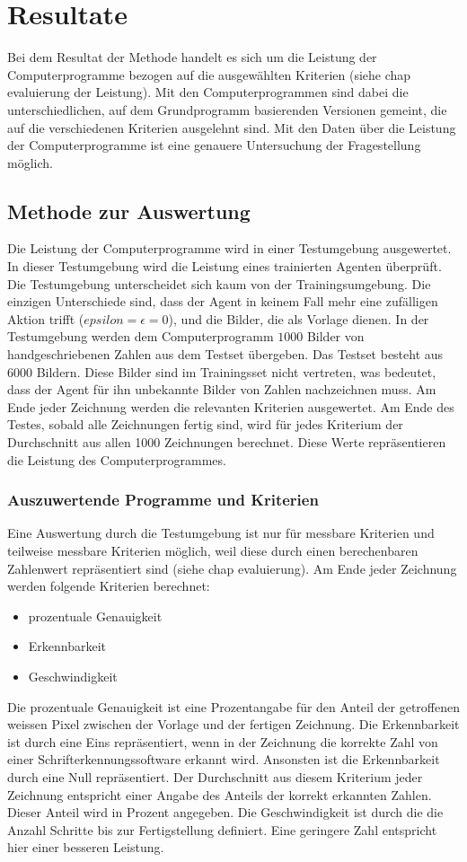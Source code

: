 \chapter{Resultate}
Bei dem Resultat der Methode handelt es sich um die Leistung der
Computerprogramme bezogen auf die ausgewählten Kriterien (siehe chap evaluierung  %
der Leistung). Mit den Computerprogrammen sind dabei die unterschiedlichen, auf
dem Grundprogramm basierenden Versionen gemeint, die auf die verschiedenen
Kriterien ausgelehnt sind.  %
Mit den Daten über die Leistung der Computerprogramme
ist eine genauere Untersuchung der Fragestellung möglich.

\section{Methode zur Auswertung}
Die Leistung der Computerprogramme wird in einer Testumgebung ausgewertet. In
dieser Testumgebung wird die Leistung eines trainierten Agenten überprüft. Die
Testumgebung unterscheidet sich kaum von der Trainingsumgebung. Die einzigen
Unterschiede sind, dass der Agent in keinem Fall mehr eine zufälligen Aktion
trifft ($epsilon = \epsilon = 0$), und die Bilder, die als Vorlage dienen. In
der Testumgebung werden dem Computerprogramm $1000$ Bilder von handgeschriebenen
Zahlen aus dem Testset übergeben. Das Testset besteht aus $6000$ Bildern. Diese
Bilder sind im Trainingsset nicht vertreten, was bedeutet, dass der Agent für
ihn unbekannte Bilder von Zahlen nachzeichnen muss. Am Ende jeder Zeichnung
werden die relevanten Kriterien ausgewertet. Am Ende des Testes, sobald alle
Zeichnungen fertig sind, wird für jedes Kriterium der Durchschnitt aus allen
1000 Zeichnungen berechnet. Diese Werte repräsentieren die Leistung des
Computerprogrammes.

\subsection*{Auszuwertende Programme und Kriterien}
Eine Auswertung durch die Testumgebung ist nur für messbare Kriterien und
teilweise messbare Kriterien möglich, weil diese durch einen berechenbaren
Zahlenwert repräsentiert sind (siehe chap evaluierung). Am Ende jeder Zeichnung  %
werden folgende Kriterien berechnet:
\begin{itemize}
    \item prozentuale Genauigkeit
    \item Erkennbarkeit
    \item Geschwindigkeit
\end{itemize}
Die prozentuale Genauigkeit ist eine Prozentangabe für den Anteil der
getroffenen weissen Pixel zwischen der Vorlage und der fertigen Zeichnung. Die
Erkennbarkeit ist durch eine Eins repräsentiert, wenn in der Zeichnung die
korrekte Zahl von einer Schrifterkennungssoftware erkannt wird. Ansonsten ist
die Erkennbarkeit durch eine Null repräsentiert. Der Durchschnitt aus diesem
Kriterium jeder Zeichnung entspricht einer Angabe des Anteils der korrekt
erkannten Zahlen. Dieser Anteil wird in Prozent angegeben. Die Geschwindigkeit
ist durch die die Anzahl Schritte bis zur Fertigstellung definiert. Eine
geringere Zahl entspricht hier einer besseren Leistung.

